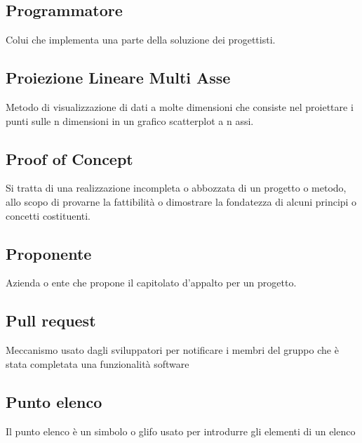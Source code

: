 \documentclass[../glossario.tex]{subfiles}
\begin{document}
\subsection*{Programmatore}
{}
Colui che implementa una parte della soluzione dei progettisti.

\subsection*{Proiezione Lineare Multi Asse}
{}
Metodo di visualizzazione di dati a molte dimensioni che consiste nel proiettare i punti sulle n dimensioni in un grafico scatterplot a n assi.

\subsection*{Proof of Concept}
{}
Si tratta di una realizzazione incompleta o abbozzata di un progetto o metodo, allo scopo di provarne la fattibilità o dimostrare la fondatezza di alcuni principi o concetti costituenti.

\subsection*{Proponente}
{}
Azienda o ente che propone il capitolato d'appalto per un progetto.

\subsection*{Pull request}
{}
Meccanismo usato dagli sviluppatori per notificare i membri del gruppo che è stata completata una funzionalità software

\subsection*{Punto elenco}
{}
Il punto elenco è un simbolo o glifo usato per introdurre gli elementi di un elenco
\end{document}
